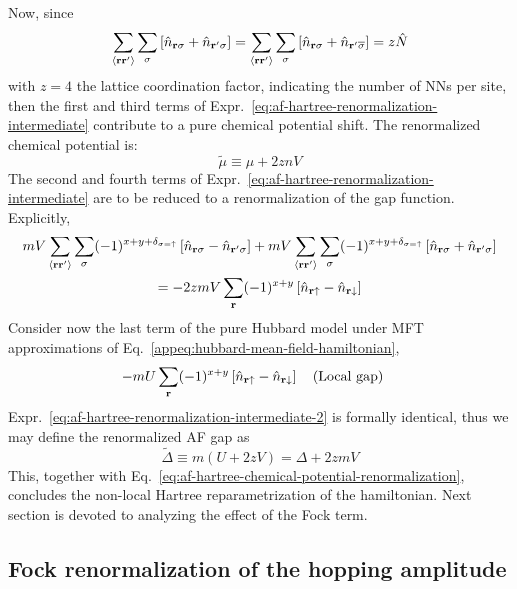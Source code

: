Now, since
\[
	\sum_{\ev{\mathbf{r}\mathbf{r}'}} \sum_\sigma \left[
		\hat n_{\mathbf{r}\sigma} + \hat n_{\mathbf{r}'\sigma}
	\right] = \sum_{\ev{\mathbf{r}\mathbf{r}'}} \sum_\sigma \left[
		\hat n_{\mathbf{r}\sigma} + \hat n_{\mathbf{r}'\overline{\sigma}}
	\right] = z \hat N
\]
with $z=4$ the lattice coordination factor, indicating the number of NNs per site, then the first and third terms of Expr.~\eqref{eq:af-hartree-renormalization-intermediate} contribute to a pure chemical potential shift. The renormalized chemical potential is:
\begin{equation}\label{eq:af-hartree-chemical-potential-renormalization}
	\tilde{\mu} \equiv \mu + 2znV
\end{equation}
The second and fourth terms of Expr.~\eqref{eq:af-hartree-renormalization-intermediate} are to be reduced to a renormalization of the gap function. Explicitly,
\begin{multline}
	mV \sum_{\ev{\mathbf{r}\mathbf{r}'}} \sum_\sigma (-1)^{x+y+\delta_{\sigma=\uparrow}} \left[
		\hat n_{\mathbf{r}\sigma} - \hat n_{\mathbf{r}'\sigma}
	\right] + mV \sum_{\ev{\mathbf{r}\mathbf{r}'}} \sum_\sigma (-1)^{x+y+\delta_{\sigma=\uparrow}} \left[
		\hat n_{\mathbf{r}\sigma} + \hat n_{\mathbf{r}'\sigma}
	\right] \\
	= -2zmV \sum_\mathbf{r} (-1)^{x+y} \left[
		\hat n_{\mathbf{r}\uparrow} - \hat n_{\mathbf{r}\downarrow}
	\right] \label{eq:af-hartree-renormalization-intermediate-2}
\end{multline}
Consider now the last term of the pure Hubbard model under MFT approximations of Eq.~\eqref{appeq:hubbard-mean-field-hamiltonian},
\[
	- mU \sum_\mathbf{r} (-1)^{x+y} \left[
		\hat n_{\mathbf{r}\uparrow} - \hat n_{\mathbf{r}\downarrow}
	\right]
	\qq{(Local gap)}
\]
Expr.~\eqref{eq:af-hartree-renormalization-intermediate-2} is formally identical, thus we may define the renormalized AF gap as
\begin{equation}\label{eq:af-hartree-gap-renormalization}
	\tilde{\Delta} \equiv m(U + 2zV) = \Delta + 2zmV
\end{equation}
This, together with Eq.~\eqref{eq:af-hartree-chemical-potential-renormalization}, concludes the non-local Hartree reparametrization of the hamiltonian. Next section is devoted to analyzing the effect of the Fock term.

\subsection{Fock renormalization of the hopping amplitude}

